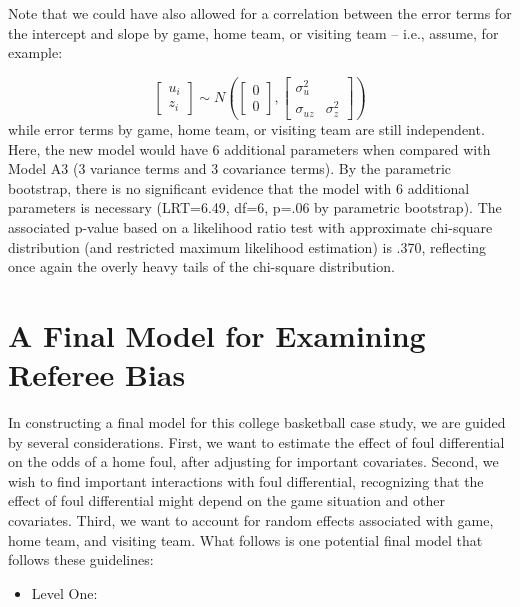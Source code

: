 \documentclass[
]{krantz}
\providecommand{\tightlist}{%
  \setlength{\itemsep}{0pt}\setlength{\parskip}{0pt}}
\begin{document}
\vspace{1cm}

Note that we could have also allowed for a correlation between the error terms for the intercept and slope by game, home team, or visiting team -- i.e., assume, for example:

\[ \left[ \begin{array}{c}
            u_{i} \\ z_{i}
          \end{array}  \right] \sim N \left( \left[
          \begin{array}{c}
            0 \\ 0
          \end{array} \right], \left[
          \begin{array}{cc}
            \sigma_{u}^{2} & \\
            \sigma_{uz} & \sigma_{z}^{2}
          \end{array} \right] \right) \]
while error terms by game, home team, or visiting team are still independent. Here, the new model would have 6 additional parameters when compared with Model A3 (3 variance terms and 3 covariance terms). By the parametric bootstrap, there is no significant evidence that the model with 6 additional parameters is necessary (LRT=6.49, df=6, p=.06 by parametric bootstrap). The associated p-value based on a likelihood ratio test with approximate chi-square distribution (and restricted maximum likelihood estimation) is .370, reflecting once again the overly heavy tails of the chi-square distribution.

\section{A Final Model for Examining Referee Bias}\label{sec:finalmodel-glmm}

In constructing a final model for this college basketball case study, we are guided by several considerations. First, we want to estimate the effect of foul differential on the odds of a home foul, after adjusting for important covariates. Second, we wish to find important interactions with foul differential, recognizing that the effect of foul differential might depend on the game situation and other covariates. Third, we want to account for random effects associated with game, home team, and visiting team. What follows is one potential final model that follows these guidelines:

\begin{itemize}
\tightlist
\item
  Level One:
\end{itemize}
\end{document}
